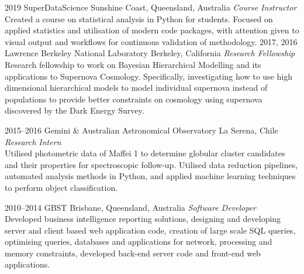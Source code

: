 \documentclass[]{friggeri-cv} %
\begin{document}
\begin{entrylist}

\entry
{2019}
{SuperDataScience}
{Sunshine Coast, Queensland, Australia}
{\emph{Course Instructor} \\
Created a course on statistical analysis in Python for students. Focused on applied statistics and utilisation of modern code packages, with attention given to visual output and workflows for continuous validation of methodology.}
\entry
{2017, 2016}
{Lawrence Berkeley National Laboratory}
{Berkeley, California}
{\emph{Research Fellowship} \\
	Research fellowship to work on Bayesian Hierarchical Modelling and its applications to Supernova Cosmology. Specifically, investigating how to use high dimensional hierarchical models to model individual supernova instead of populations to provide better constraints on cosmology using supernova discovered by the Dark Energy Survey.}


\entry
{2015--2016}
{Gemini \& Australian Astronomical Observatory}
{La Serena, Chile}
{\emph{Research Intern} \\
Utilised photometric data of Maffei 1 to determine globular cluster candidates and their properties for spectroscopic follow-up. Utilised data reduction pipelines, automated analysis methods in Python, and applied machine learning techniques to perform object classification.}

\entry
{2010--2014}
{GBST}
{Brisbane, Queensland, Australia}
{\emph{Software Developer} \\
Developed business intelligence reporting solutions, designing and developing server and client based web application code, creation of large scale SQL queries, optimising queries, databases and applications for network, processing and memory constraints, developed back-end server code and front-end web applications.}


\end{entrylist}
\end{document}
